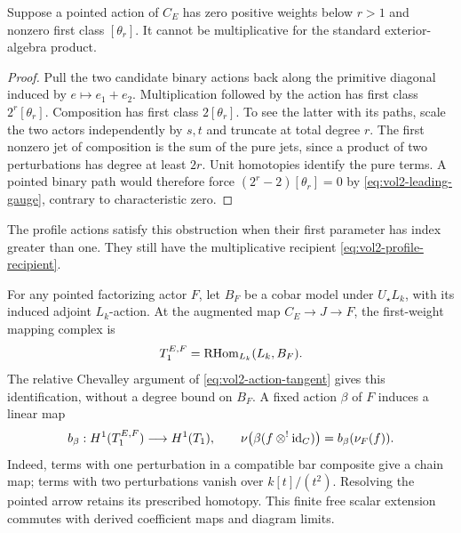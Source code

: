 \begin{proposition}\label{prop:vol2-higher-weight-product}
Suppose a pointed action of $C_E$ has zero positive weights
below $r>1$ and nonzero first class $[\theta_r]$. It cannot
be multiplicative for the standard exterior-algebra product.
\end{proposition}
\begin{proof}
Pull the two candidate binary actions back along the primitive
diagonal induced by $e\mapsto e_1+e_2$. Multiplication followed
by the action has first class $2^r[\theta_r]$. Composition has
first class $2[\theta_r]$. To see the latter with its paths,
scale the two actors independently by $s,t$ and truncate at
total degree $r$. The first nonzero jet of composition is
the sum of the pure jets, since a product of two perturbations
has degree at least $2r$. Unit homotopies identify the pure
terms. A pointed binary path would therefore force
$(2^r-2)[\theta_r]=0$ by
\eqref{eq:vol2-leading-gauge}, contrary to characteristic zero.
\end{proof}

The profile actions satisfy this obstruction when their first
parameter has index greater than one. They still have the
multiplicative recipient \eqref{eq:vol2-profile-recipient}.

For any pointed factorizing actor $F$, let $B_F$ be a cobar
model under $U_\star L_k$, with its induced adjoint $L_k$-action.
At the augmented map $C_E\to J\to F$, the first-weight
mapping complex is
\[
 T_1^{E,F}=\operatorname{RHom}_{L_k}(L_k,B_F).
\]
The relative Chevalley argument of
\eqref{eq:vol2-action-tangent} gives this identification,
without a degree bound on $B_F$. A fixed action $\beta$ of
$F$ induces a linear map
\begin{equation}\label{eq:vol2-action-chain-rule}
 b_\beta:H^1(T_1^{E,F})\longrightarrow H^1(T_1),\qquad
 \nu\bigl(\beta(f\mathbin{\otimes^!}\mathrm{id}_C)\bigr)=b_\beta(\nu_F(f)).
\end{equation}
Indeed, terms with one perturbation in a compatible bar
composite give a chain map; terms with two perturbations
vanish over $k[t]/(t^2)$. Resolving the pointed arrow retains
its prescribed homotopy. This finite free scalar extension
commutes with derived coefficient maps and diagram limits.

